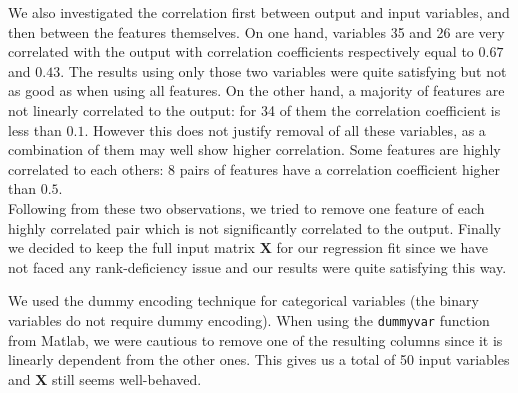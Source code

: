 \documentclass{article} %
\begin{document}
  We also investigated the correlation first between output and input variables, and then between the features themselves. On one hand, variables 35 and 26 are very correlated with the output with correlation coefficients respectively equal to $0.67$ and $0.43$. The results using only those two variables were quite satisfying but not as good as when using all features. On the other hand, a majority of features are not linearly correlated to the output: for 34 of them the correlation coefficient is less than $0.1$. However this does not justify removal of all these variables, as a combination of them may well show higher correlation. Some features are highly correlated to each others: 8 pairs of features have a correlation coefficient higher than $0.5$.\\
  Following from these two observations, we tried to remove one feature of each highly correlated pair which is not significantly correlated to the output. Finally we decided to keep the full input matrix $\mathbf{X}$ for our regression fit since we have not faced any rank-deficiency issue and our results were quite satisfying this way.

  We used the dummy encoding technique for categorical variables (the binary variables do not require dummy encoding). When using the \texttt{dummyvar} function from Matlab, we were cautious to remove one of the resulting columns since it is linearly dependent from the other ones. This gives us a total of 50 input variables and $\mathbf{X}$ still seems well-behaved.
\end{document}
